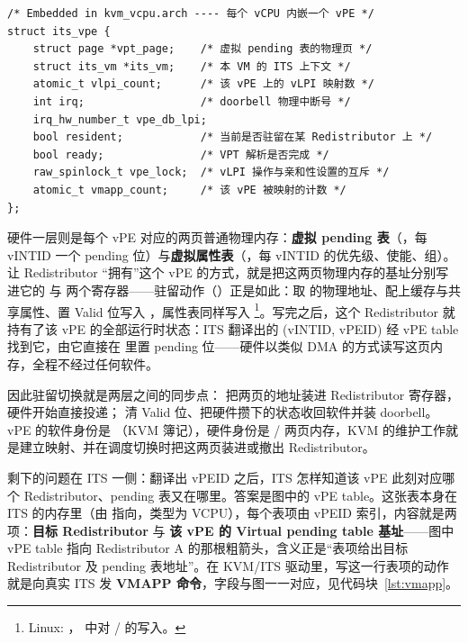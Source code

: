 \begin{lstlisting}[caption={KVM 中 vPE 的软件身份：its\_vpe（include/linux/irqchip/arm-gic-v4.h，节选）},label={lst:its-vpe}]
/* Embedded in kvm_vcpu.arch ---- 每个 vCPU 内嵌一个 vPE */
struct its_vpe {
    struct page *vpt_page;    /* 虚拟 pending 表的物理页 */
    struct its_vm *its_vm;    /* 本 VM 的 ITS 上下文 */
    atomic_t vlpi_count;      /* 该 vPE 上的 vLPI 映射数 */
    int irq;                  /* doorbell 物理中断号 */
    irq_hw_number_t vpe_db_lpi;
    bool resident;            /* 当前是否驻留在某 Redistributor 上 */
    bool ready;               /* VPT 解析是否完成 */
    raw_spinlock_t vpe_lock;  /* vLPI 操作与亲和性设置的互斥 */
    atomic_t vmapp_count;     /* 该 vPE 被映射的计数 */
};
\end{lstlisting}

硬件一层则是每个 vPE 对应的两页普通物理内存：\textbf{虚拟 pending 表}（，每 vINTID 一个 pending 位）与\textbf{虚拟属性表}（，每 vINTID 的优先级、使能、组）。让 Redistributor “拥有”这个 vPE 的方式，就是把这两页物理内存的基址分别写进它的  与  两个寄存器——驻留动作（）正是如此：取  的物理地址、配上缓存与共享属性、置 Valid 位写入 ，属性表同样写入 \footnote{Linux: ， 中对 / 的写入。}。写完之后，这个 Redistributor 就持有了该 vPE 的全部运行时状态：ITS 翻译出的 (vINTID, vPEID) 经 vPE table 找到它，由它直接在  里置 pending 位——硬件以类似 DMA 的方式读写这页内存，全程不经过任何软件。

因此驻留切换就是两层之间的同步点： 把两页的地址装进 Redistributor 寄存器，硬件开始直接投递； 清 Valid 位、把硬件攒下的状态收回软件并装 doorbell。vPE 的软件身份是 （KVM 簿记），硬件身份是 / 两页内存，KVM 的维护工作就是建立映射、并在调度切换时把这两页装进或撤出 Redistributor。

剩下的问题在 ITS 一侧：翻译出 vPEID 之后，ITS 怎样知道该 vPE 此刻对应哪个 Redistributor、pending 表又在哪里。答案是图中的 vPE table。这张表本身在 ITS 的内存里（由  指向，类型为 VCPU），每个表项由 vPEID 索引，内容就是两项：\textbf{目标 Redistributor} 与 \textbf{该 vPE 的 Virtual pending table 基址}——图中 vPE table 指向 Redistributor A 的那根粗箭头，含义正是“表项给出目标 Redistributor 及 pending 表地址”。在 KVM/ITS 驱动里，写这一行表项的动作就是向真实 ITS 发 \textbf{VMAPP 命令}，字段与图一一对应，见代码块~\ref{lst:vmapp}。


